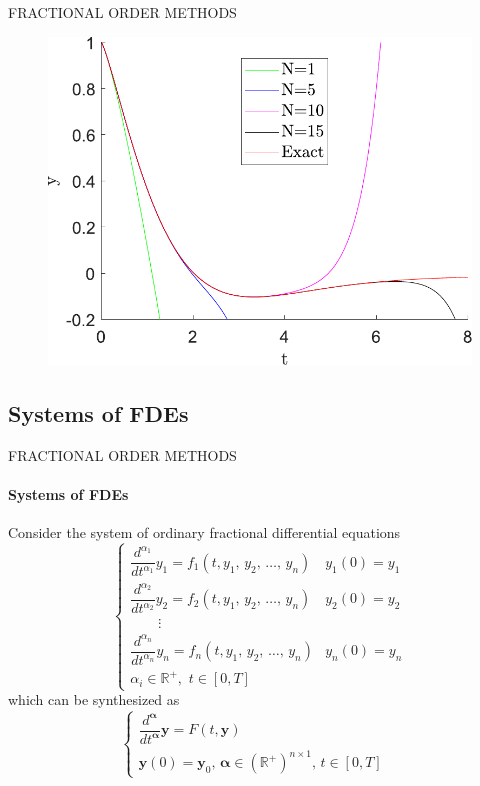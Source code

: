 \begin{frame}{FRACTIONAL ORDER METHODS}
\begin{multicols}{2}
\begin{figure}[H]
        \includegraphics[scale=0.34]{files/frac_deco.pdf}
    \end{figure}
\end{multicols}
\end{frame}

\subsection{Systems of FDEs}
\begin{frame}{FRACTIONAL ORDER METHODS}
    \framesubtitle{Systems of FDEs}
    Consider the system of ordinary fractional differential equations
    \begin{equation}
        \begin{cases}
            \dfrac{d^{\alpha_1}}{dt^{\alpha_1}}y_1=f_1(t,y_1,\,y_2,\,\dots,\,y_n)&y_1(0)=y_{1}\\[6pt] \dfrac{d^{\alpha_2}}{dt^{\alpha_2}}y_2=f_2(t,y_1,\,y_2,\,\dots,\,y_n)&y_2(0)=y_{2}\\
            \qquad\vdots&\\
            \dfrac{d^{\alpha_n}}{dt^{\alpha_n}}y_n=f_n(t,y_1,\,y_2,\,\dots,\,y_n)&y_n(0)=y_{n}\\[6pt]
            \alpha_i\in\mathbb{R}^+,\,\,t\in[0,T]
        \end{cases}
    \end{equation}
    which can be synthesized as 
    \begin{equation}
        \begin{cases}
            \dfrac{d^{\pmb{\alpha}}}{dt^{\pmb{\alpha}}}\mathbf{y}=F(t,\mathbf{y})&\\
            \mathbf{y}(0)=\mathbf{y}_0,\,\pmb{\alpha}\in\left(\mathbb{R}^+\right)^{n\times1},\,t\in[0,T]
        \end{cases}
    \end{equation}
\end{frame}

